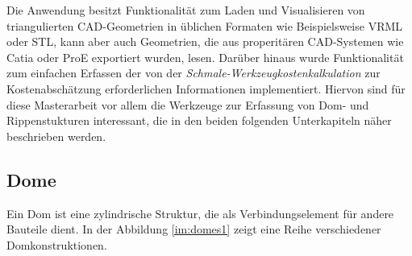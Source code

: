 Die Anwendung besitzt Funktionalität zum Laden und Visualisieren von triangulierten CAD-Geometrien in üblichen Formaten wie Beispielsweise VRML oder STL, kann aber auch Geometrien, die aus properit\"aren CAD-Systemen wie Catia oder ProE exportiert wurden, lesen. Dar\"uber hinaus wurde Funktionalit\"at zum einfachen Erfassen der von der \textit{Schmale-Werkzeugkostenkalkulation} zur Kostenabsch\"atzung erforderlichen Informationen implementiert. Hiervon sind f\"ur diese Masterarbeit vor allem die Werkzeuge zur Erfassung von Dom- und Rippenstukturen interessant, die in den beiden folgenden Unterkapiteln n\"aher beschrieben werden.

\subsection{Dome}
\label{dome}

Ein Dom ist eine zylindrische Struktur, die als Verbindungselement f\"ur andere Bauteile dient. In der Abbildung \ref{im:domes1} zeigt eine Reihe verschiedener Domkonstruktionen.

